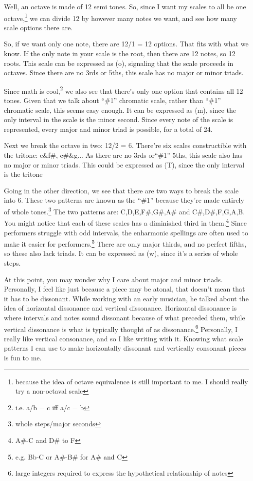 \documentclass[12pt]{article}[titlepage]
\newcommand{\say}[1]{``\#1''}
\newcommand{\1}{\={a}}
\newcommand{\2}{\={e}}
\newcommand{\3}{\={\i}}
\newcommand{\4}{\=o}
\newcommand{\5}{\=u}
\newcommand{\6}{\={A}}
\renewcommand{\,}{\textsuperscript{,}}
\begin{document}
Well, an octave is made of 12 semi tones.
So, since I want my scales to all be one octave,\footnote{because the idea of octave equivalence is still important to me. I should really try a non-octaval scale} we can divide 12 by however many notes we want, and see how many scale options there are.

So, if we want only one note, there are 12/1 = 12 options.
That fits with what we know.
If the only note in your scale is the root, then there are 12 notes, so 12 roots.
This scale can be expressed as (o), signaling that the scale proceeds in octaves.
Since there are no 3rds or 5ths, this scale has no major or minor triads.

Since math is cool,\footnote{i.e. a/b = c iff a/c = b} we also see that there's only one option that contains all 12 tones.
Given that we talk about \say{the} chromatic scale, rather than \say{a} chromatic scale, this seems easy enough.
It can be expressed as (m), since the only interval in the scale is the minor second.
Since every note of the scale is represented, every major and minor triad is possible, for a total of 24.

Next we break the octave in two: 12/2 = 6.
There're six scales constructible with the tritone: c\&f\#, c\#\&g...
As there are no 3rds or\say{perfect} 5ths, this scale also has no major or minor triads.
This could be expressed as (T), since the only interval is the tritone

Going in the other direction, we see that there are two ways to break the scale into 6.
These two patterns are known as the \say{whole tone scale,} because they're made entirely of whole tones.\footnote{whole steps/major seconds}
The two patterns are: C,D,E,F\#,G\#,A\# and C\#,D\#,F,G,A,B.
You might notice that each of these scales has a diminished third in them.\footnote{A\#-C and D\# to F}
Since performers struggle with odd intervals, the enharmonic spellings are often used to make it easier for performers.\footnote{e.g. Bb-C or A\#-B\# for A\# and C}
There are only major thirds, and no perfect fifths, so these also lack triads.
It can be expressed as (w), since it's a series of whole steps.

At this point, you may wonder why I care about major and minor triads.
Personally, I feel like just because a piece may be atonal, that doesn't mean that it has to be dissonant.
While working with an early musician, he talked about the idea of horizontal dissonance and vertical dissonance.
Horizontal dissonance is where intervals and notes sound dissonant because of what preceded them, while vertical dissonance is what is typically thought of as dissonance.\footnote{large integers required to express the hypothetical relationship of notes}
Personally, I really like vertical consonance, and so I like writing with it.
Knowing what scale patterns I can use to make horizontally dissonant and vertically consonant pieces is fun to me.
\end{document}

